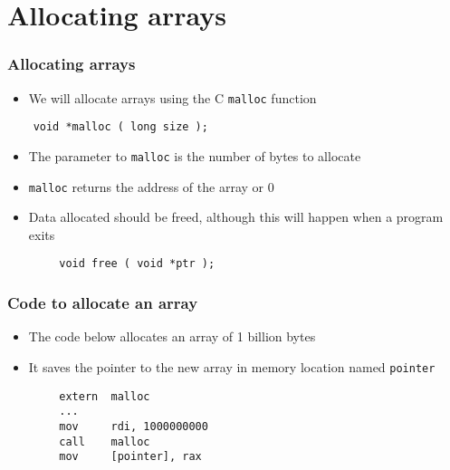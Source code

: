 \documentclass{beamer}
\begin{document}
\section{Allocating arrays}

\begin{frame}[fragile]
    \frametitle{Allocating arrays}
    \begin{itemize}
        \item We will allocate arrays using the C {\tt malloc} function
    \end{itemize}
\begin{verbatim}
    void *malloc ( long size );
\end{verbatim}
    \begin{itemize}
        \item The parameter to {\tt malloc} is the number of bytes to allocate
        \item {\tt malloc} returns the address of the array or 0
        \item Data allocated should be freed, although this will happen when a
              program exits
    \end{itemize}
\begin{verbatim}
        void free ( void *ptr );
\end{verbatim}

\end{frame}

\begin{frame}[fragile]
    \frametitle{Code to allocate an array}
    \begin{itemize}
        \item The code below allocates an array of 1 billion bytes
        \item It saves the pointer to the new array in memory location
              named {\tt pointer}
    \end{itemize}

\begin{verbatim}
        extern  malloc
        ...
        mov     rdi, 1000000000
        call    malloc
        mov     [pointer], rax
\end{verbatim}
\end{frame}
\end{document}
